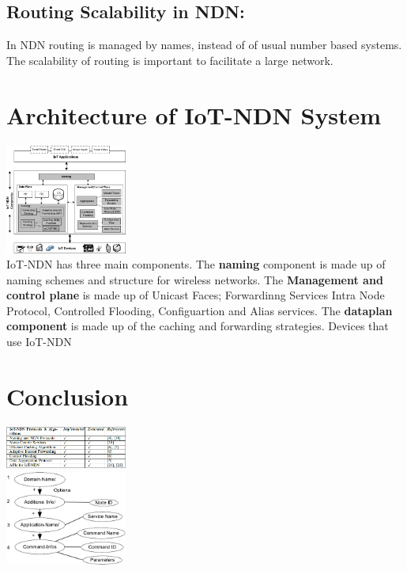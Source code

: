 \documentclass[conference]{IEEEtran}
\begin{document}
\subsection{Routing Scalability in NDN:}
In NDN routing is managed by names, instead of of usual number based systems. The scalability of routing is important to facilitate a large network.

\section{Architecture of IoT-NDN System}

\includegraphics[width=0.3\textwidth]{IoT-NDN_System_architecture_and_its_components.png}\\
IoT-NDN has three main components. The \textbf{naming} component is made up of naming schemes and structure for wireless networks.
The \textbf{Management and control plane} is made up of Unicast Faces; Forwardinng Services Intra Node Protocol, Controlled Flooding, Configuartion and Alias services. %
The \textbf{dataplan component} is made up of the caching and forwarding strategies.
Devices that use IoT-NDN


\section{Conclusion}


\includegraphics[width=0.3\textwidth]{IMPLEMENTED_AND_TESTED_PROTOCOLS_AND_ALGORITHMS_IN_IOT-NDN.png}\\
\includegraphics[width=0.3\textwidth]{Name_Structure_of_the_suggested_Approach.png}\\
\end{document}
